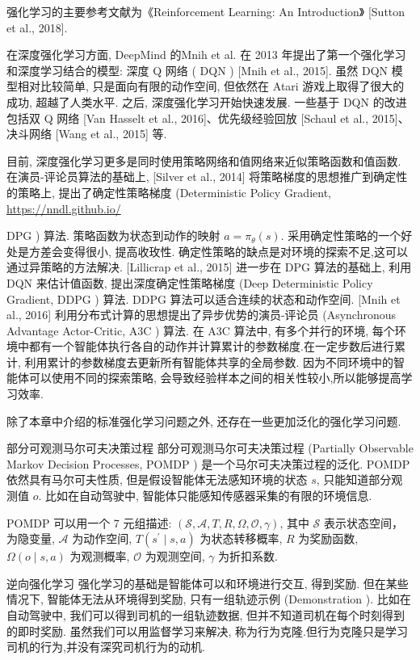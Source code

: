\documentclass[10pt]{article}
\begin{document}
强化学习的主要参考文献为《Reinforcement Learning: An Introduction》 [Sutton et al., 2018].

在深度强化学习方面, DeepMind 的Mnih et al. 在 2013 年提出了第一个强化学习和深度学习结合的模型: 深度 Q 网络 ( DQN ) [Mnih et al., 2015]. 虽然 DQN 模型相对比较简单, 只是面向有限的动作空间, 但依然在 Atari 游戏上取得了很大的成功, 超越了人类水平. 之后, 深度强化学习开始快速发展. 一些基于 DQN 的改进包括双 Q 网络 [Van Hasselt et al., 2016]、优先级经验回放 [Schaul et al., 2015]、决斗网络 [Wang et al., 2015] 等.

目前, 深度强化学习更多是同时使用策略网络和值网络来近似策略函数和值函数. 在演员-评论员算法的基础上, [Silver et al., 2014] 将策略梯度的思想推广到确定性的策略上, 提出了确定性策略梯度 (Deterministic Policy Gradient, \href{https://nndl.github.io/}{https://nndl.github.io/}

DPG ) 算法. 策略函数为状态到动作的映射 $a=\pi_{\theta}(s)$. 采用确定性策略的一个好处是方差会变得很小, 提高收玫性. 确定性策略的缺点是对环境的探索不足,这可以通过异策略的方法解决. [Lillicrap et al., 2015] 进一步在 DPG 算法的基础上, 利用 DQN 来估计值函数, 提出深度确定性策略梯度 (Deep Deterministic Policy Gradient, DDPG ) 算法. DDPG 算法可以适合连续的状态和动作空间. [Mnih et al., 2016] 利用分布式计算的思想提出了异步优势的演员-评论员 (Asynchronous Advantage Actor-Critic, A3C ) 算法. 在 A3C 算法中, 有多个并行的环境, 每个环境中都有一个智能体执行各自的动作并计算累计的参数梯度.在一定步数后进行累计, 利用累计的参数梯度去更新所有智能体共享的全局参数. 因为不同环境中的智能体可以使用不同的探索策略, 会导致经验样本之间的相关性较小,所以能够提高学习效率.

除了本章中介绍的标准强化学习问题之外, 还存在一些更加泛化的强化学习问题.

部分可观测马尔可夫决策过程 部分可观测马尔可夫决策过程 (Partially Observable Markov Decision Processes, POMDP ) 是一个马尔可夫决策过程的泛化. POMDP 依然具有马尔可夫性质, 但是假设智能体无法感知环境的状态 $s$, 只能知道部分观测值 $o$. 比如在自动驾驶中, 智能体只能感知传感器采集的有限的环境信息.

POMDP 可以用一个 7 元组描述: $(\mathcal{S}, \mathcal{A}, T, R, \Omega, \mathcal{O}, \gamma)$, 其中 $\mathcal{S}$ 表示状态空间，为隐变量, $\mathcal{A}$ 为动作空间, $T\left(s^{\prime} \mid s, a\right)$ 为状态转移概率, $R$ 为奖励函数, $\Omega(o \mid s, a)$ 为观测概率, $\mathcal{O}$ 为观测空间, $\gamma$ 为折扣系数.

逆向强化学习 强化学习的基础是智能体可以和环境进行交互, 得到奖励. 但在某些情况下, 智能体无法从环境得到奖励, 只有一组轨迹示例 (Demonstration ). 比如在自动驾驶中, 我们可以得到司机的一组轨迹数据, 但并不知道司机在每个时刻得到的即时奖励. 虽然我们可以用监督学习来解决, 称为行为克隆.但行为克隆只是学习司机的行为,并没有深究司机行为的动机.
\end{document}
